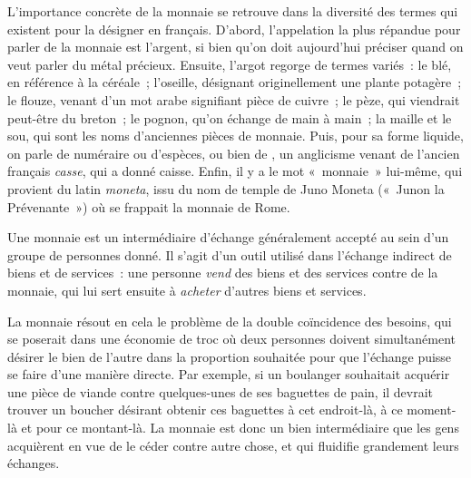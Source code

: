 L'importance concrète de la monnaie se retrouve dans la diversité des termes qui existent pour la désigner en français. D'abord, l'appelation la plus répandue pour parler de la monnaie est l'argent, si bien qu'on doit aujourd'hui préciser quand on veut parler du métal précieux. Ensuite, l'argot regorge de termes variés~: le blé, en référence à la céréale~; l'oseille, désignant originellement une plante potagère~; le flouze, venant d'un mot arabe signifiant pièce de cuivre~; le pèze, qui viendrait peut-être du breton~; le pognon, qu'on échange de main à main~; la maille et le sou, qui sont les noms d'anciennes pièces de monnaie. Puis, pour sa forme liquide, on parle de numéraire ou d'espèces, ou bien de , un anglicisme venant de l'ancien français \emph{casse}, qui a donné caisse. Enfin, il y a le mot «~monnaie~» lui-même, qui provient du latin \emph{moneta}, issu du nom de temple de Juno Moneta («~Junon la Prévenante~») où se frappait la monnaie de Rome.

Une monnaie est un intermédiaire d'échange généralement accepté au sein d'un groupe de personnes donné. Il s'agit d'un outil utilisé dans l'échange indirect de biens et de services~: une personne \emph{vend} des biens et des services contre de la monnaie, qui lui sert ensuite à \emph{acheter} d'autres biens et services.

La monnaie résout en cela le problème de la double coïncidence des besoins, qui se poserait dans une économie de troc où deux personnes doivent simultanément désirer le bien de l'autre dans la proportion souhaitée pour que l'échange puisse se faire d'une manière directe. Par exemple, si un boulanger souhaitait acquérir une pièce de viande contre quelques-unes de ses baguettes de pain, il devrait trouver un boucher désirant obtenir ces baguettes à cet endroit-là, à ce moment-là et pour ce montant-là. La monnaie est donc un bien intermédiaire que les gens acquièrent en vue de le céder contre autre chose, et qui fluidifie grandement leurs échanges.

